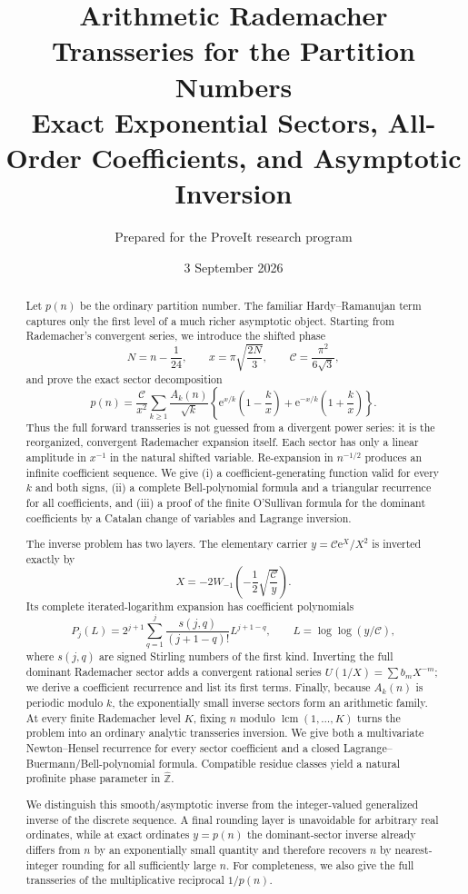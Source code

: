 \documentclass[11pt,a4paper]{article}
\title{\bfseries Arithmetic Rademacher Transseries for the Partition Numbers\\[0.35em]
\large Exact Exponential Sectors, All-Order Coefficients, and Asymptotic Inversion}
\author{Prepared for the ProveIt research program}
\date{3 September 2026}
\numberwithin{equation}{section}
\theoremstyle{remark}
\newcommand{\e}{\mathrm e}
\newcommand{\Ccal}{\mathcal C}
\begin{document}
\maketitle

\begin{abstract}
Let $p(n)$ be the ordinary partition number.  The familiar Hardy--Ramanujan term captures only the first level of a much richer asymptotic object.  Starting from Rademacher's convergent series, we introduce the shifted phase
\[
 N=n-\frac1{24},\qquad x=\pi\sqrt{\frac{2N}{3}},\qquad
 \Ccal=\frac{\pi^2}{6\sqrt3},
\]
and prove the exact sector decomposition
\[
 p(n)=\frac{\Ccal}{x^2}\sum_{k\ge1}\frac{A_k(n)}{\sqrt{k}}
 \left\{\e^{x/k}\left(1-\frac{k}{x}\right)
       +\e^{-x/k}\left(1+\frac{k}{x}\right)\right\}.
\]
Thus the full forward transseries is not guessed from a divergent power series: it is the reorganized, convergent Rademacher expansion itself.  Each sector has only a linear amplitude in $x^{-1}$ in the natural shifted variable.  Re-expansion in $n^{-1/2}$ produces an infinite coefficient sequence.  We give (i) a coefficient-generating function valid for every $k$ and both signs, (ii) a complete Bell-polynomial formula and a triangular recurrence for all coefficients, and (iii) a proof of the finite O'Sullivan formula for the dominant coefficients by a Catalan change of variables and Lagrange inversion.

The inverse problem has two layers.  The elementary carrier $y=\Ccal\e^X/X^2$ is inverted exactly by
\[
 X=-2W_{-1}\!\left(-\frac12\sqrt{\frac{\Ccal}{y}}\right).
\]
Its complete iterated-logarithm expansion has coefficient polynomials
\[
 P_j(L)=2^{j+1}\sum_{q=1}^{j}\frac{s(j,q)}{(j+1-q)!}L^{j+1-q},
 \qquad L=\log\log(y/\Ccal),
\]
where $s(j,q)$ are signed Stirling numbers of the first kind.  Inverting the full dominant Rademacher sector adds a convergent rational series $U(1/X)=\sum b_mX^{-m}$; we derive a coefficient recurrence and list its first terms.  Finally, because $A_k(n)$ is periodic modulo $k$, the exponentially small inverse sectors form an arithmetic family.  At every finite Rademacher level $K$, fixing $n$ modulo $\operatorname{lcm}(1,\ldots,K)$ turns the problem into an ordinary analytic transseries inversion.  We give both a multivariate Newton--Hensel recurrence for every sector coefficient and a closed Lagrange--Buer\-mann/Bell-polynomial formula.  Compatible residue classes yield a natural profinite phase parameter in $\widehat{\mathbb Z}$.

We distinguish this smooth/asymptotic inverse from the integer-valued generalized inverse of the discrete sequence.  A final rounding layer is unavoidable for arbitrary real ordinates, while at exact ordinates $y=p(n)$ the dominant-sector inverse already differs from $n$ by an exponentially small quantity and therefore recovers $n$ by nearest-integer rounding for all sufficiently large $n$.  For completeness, we also give the full transseries of the multiplicative reciprocal $1/p(n)$.
\end{abstract}
\end{document}
